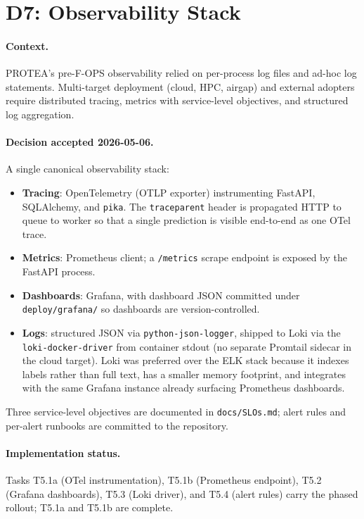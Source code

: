 \section{D7: Observability Stack}
\label{app:adr-d7}

\paragraph{Context.}
PROTEA's pre-F-OPS observability relied on per-process log files and ad-hoc
log statements. Multi-target deployment (cloud, HPC, airgap) and external
adopters require distributed tracing, metrics with service-level objectives,
and structured log aggregation.

\paragraph{Decision accepted 2026-05-06.}
A single canonical observability stack:

\begin{itemize}
  \item \textbf{Tracing}: OpenTelemetry (OTLP exporter) instrumenting FastAPI,
    SQLAlchemy, and \texttt{pika}. The \texttt{traceparent} header is
    propagated HTTP to queue to worker so that a single prediction is
    visible end-to-end as one OTel trace.
  \item \textbf{Metrics}: Prometheus client; a \texttt{/metrics} scrape
    endpoint is exposed by the FastAPI process.
  \item \textbf{Dashboards}: Grafana, with dashboard JSON committed under
    \texttt{deploy/grafana/} so dashboards are version-controlled.
  \item \textbf{Logs}: structured JSON via \texttt{python-json-logger},
    shipped to Loki via the \texttt{loki-docker-driver} from container
    stdout (no separate Promtail sidecar in the cloud target). Loki was
    preferred over the ELK stack because it indexes labels rather than
    full text, has a smaller memory footprint, and integrates with the
    same Grafana instance already surfacing Prometheus dashboards.
\end{itemize}

Three service-level objectives are documented in \texttt{docs/SLOs.md};
alert rules and per-alert runbooks are committed to the repository.

\paragraph{Implementation status.}
Tasks T5.1a (OTel instrumentation), T5.1b (Prometheus endpoint), T5.2
(Grafana dashboards), T5.3 (Loki driver), and T5.4 (alert rules) carry the
phased rollout; T5.1a and T5.1b are complete.

